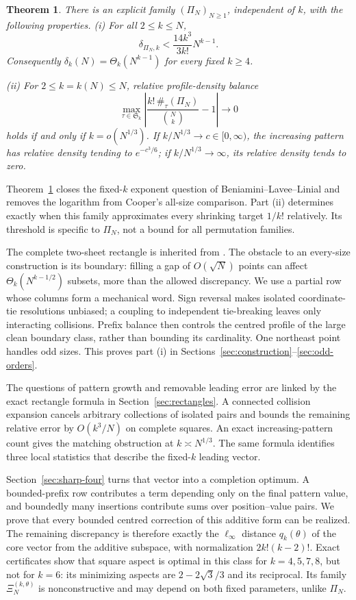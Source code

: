\documentclass[11pt,letterpaper]{article}
\newtheorem{theorem}{Theorem}[section]
\newcommand{\Ssym}{\mathfrak S}
\begin{document}
\begin{theorem}\label{thm:main}
There is an explicit family $(\Pi_N)_{N\ge1}$, independent of $k$, with the
following properties.
\textup{(i)} For all $2\le k\le N$,
\[
 \delta_{\Pi_N,k}<\frac{14k^3}{3k!}N^{k-1}.
\]
Consequently $\delta_k(N)=\Theta_k(N^{k-1})$ for every fixed $k\ge4$.
\par\noindent\textup{(ii)} For $2\le k=k(N)\le N$, relative profile-density balance
\[
 \max_{\tau\in\Ssym_k}
 \left|\frac{k!\,\#_\tau(\Pi_N)}{\binom Nk}-1\right|\longrightarrow0
\]
holds if and only if $k=o(N^{1/3})$. If $k/N^{1/3}\to c\in[0,\infty)$,
the increasing pattern has relative density tending to $e^{-c^3/6}$;
if $k/N^{1/3}\to\infty$, its relative density tends to zero.
\end{theorem}

Theorem~\ref{thm:main} closes the fixed-$k$ exponent question of
Beniamini--Lavee--Linial and removes the logarithm from Cooper's all-size
comparison. Part (ii) determines exactly when this family approximates
every shrinking target $1/k!$ relatively.
Its threshold is specific to $\Pi_N$, not a bound for all permutation families.

The complete two-sheet rectangle is inherited from \cite{BLL}.  The
obstacle to an every-size construction is its boundary: filling a gap of
$O(\sqrt N)$ points can affect $\Theta_k(N^{k-1/2})$ subsets, more than the
allowed discrepancy.  We use a partial row whose columns form a mechanical
word.  Sign reversal makes isolated coordinate-tie resolutions unbiased;
a coupling to independent tie-breaking leaves only interacting collisions.
Prefix balance then controls the centred profile of the large clean boundary
class, rather than bounding its cardinality.  One northeast point handles
odd sizes. This proves part (i) in
Sections~\ref{sec:construction}--\ref{sec:odd-orders}.

The questions of pattern growth and removable leading error are linked by
the exact rectangle formula in Section~\ref{sec:rectangles}. A connected
collision expansion cancels arbitrary collections of isolated pairs and
bounds the remaining relative error by $O(k^3/N)$ on complete squares.
An exact increasing-pattern count gives the matching obstruction at
$k\asymp N^{1/3}$. The same formula identifies three local statistics
that describe the fixed-$k$ leading vector.

Section~\ref{sec:sharp-four} turns that vector into a completion optimum.
A bounded-prefix row contributes a term depending only on the final pattern
value, and boundedly many insertions contribute sums over position--value
pairs.  We prove that every bounded centred correction of this additive
form can be realized.  The remaining discrepancy is therefore exactly the
$\ell_\infty$ distance $q_k(\theta)$ of the core vector from the additive
subspace, with normalization $2k!(k-2)!$.  Exact certificates show that square
aspect is optimal in this class for $k=4,5,7,8$, but not for $k=6$: its
minimizing aspects are $2-2\sqrt3/3$ and its reciprocal.  Its family $\Xi_N^{(k,\theta)}$ is nonconstructive and may depend on both
fixed parameters, unlike $\Pi_N$.
\end{document}
